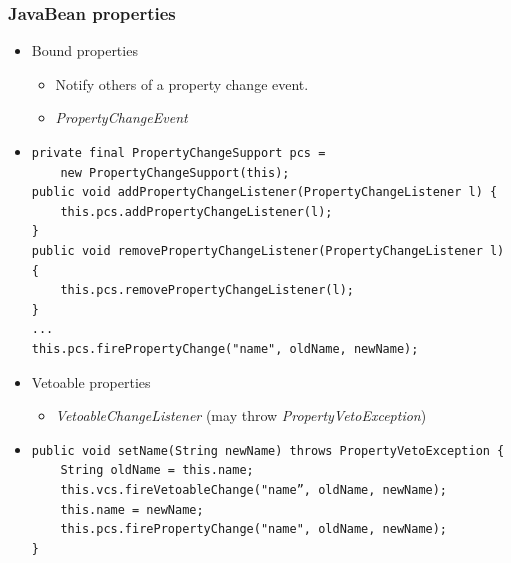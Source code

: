 \documentclass[10pt,xcolor=pdflatex]{beamer}
\begin{document}
\begin{frame}[containsverbatim]\frametitle{JavaBean properties}
	\begin{itemize}
      \item Bound properties
		\begin{itemize}
		  \item Notify others of a property change event.
		  \item \emph{PropertyChangeEvent}
        \end{itemize}
      \item[] \begin{footnotesize} \begin{verbatim}
private final PropertyChangeSupport pcs =    
    new PropertyChangeSupport(this);
public void addPropertyChangeListener(PropertyChangeListener l) {
    this.pcs.addPropertyChangeListener(l); 
}
public void removePropertyChangeListener(PropertyChangeListener l) 
{
    this.pcs.removePropertyChangeListener(l); 
}
... 
this.pcs.firePropertyChange("name", oldName, newName);        
        \end{verbatim} \end{footnotesize}
		
      \item Vetoable properties
	    \begin{itemize}
		  \item \emph{VetoableChangeListener} (may throw \emph{PropertyVetoException})
        \end{itemize}
      \item[] \begin{footnotesize} \begin{verbatim}
public void setName(String newName) throws PropertyVetoException {  
    String oldName = this.name;  
    this.vcs.fireVetoableChange("name”, oldName, newName);  
    this.name = newName;  
    this.pcs.firePropertyChange("name", oldName, newName);      
}
\end{verbatim} \end{footnotesize}
	\end{itemize}
\end{frame}
\end{document}
